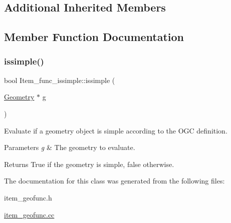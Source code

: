 \subsection*{Additional Inherited Members}


\subsection{Member Function Documentation}
\mbox{\label{classItem__func__issimple_a4b5ac7a1b79f0629719c9fb1d87a72ec}} 
\subsubsection{\texorpdfstring{issimple()}{issimple()}}
{\footnotesize\ttfamily bool Item\+\_\+func\+\_\+issimple\+::issimple (\begin{DoxyParamCaption}\item[{\mbox{\hyperlink{classGeometry}{Geometry}} $\ast$}]{g }\end{DoxyParamCaption})}

Evaluate if a geometry object is simple according to the O\+GC definition.


\begin{DoxyParams}{Parameters}
{\em g} & The geometry to evaluate. \\
\hline
\end{DoxyParams}
\begin{DoxyReturn}{Returns}
True if the geometry is simple, false otherwise. 
\end{DoxyReturn}


The documentation for this class was generated from the following files\+:\begin{DoxyCompactItemize}
\item 
item\+\_\+geofunc.\+h\item 
\mbox{\hyperlink{item__geofunc_8cc}{item\+\_\+geofunc.\+cc}}\end{DoxyCompactItemize}
